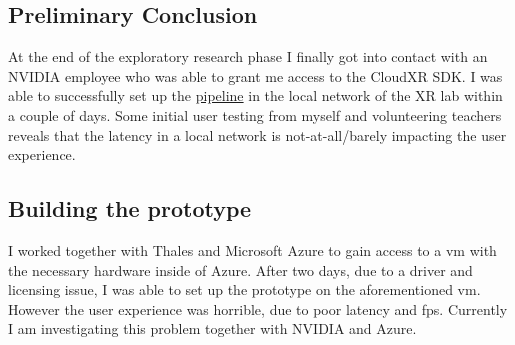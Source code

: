 \subsection{Preliminary Conclusion}
At the end of the exploratory research phase I finally got into contact with an NVIDIA employee who was able to grant me access to the CloudXR SDK. I was able to successfully set up the \hyperref[fig:pr0]{pipeline} in the local network of the XR lab within a couple of days. Some initial user testing from myself and volunteering teachers reveals that the latency in a local network is not-at-all/barely impacting the user experience.

\subsection{Building the prototype}
I worked together with Thales and Microsoft Azure to gain access to a \acrfull{vm} with the necessary hardware inside of Azure. After two days, due to a driver and licensing issue, I was able to set up the prototype on the aforementioned \acrshort{vm}. However the user experience was horrible, due to poor latency and \acrshort{fps}. Currently I am investigating this problem together with NVIDIA and Azure.